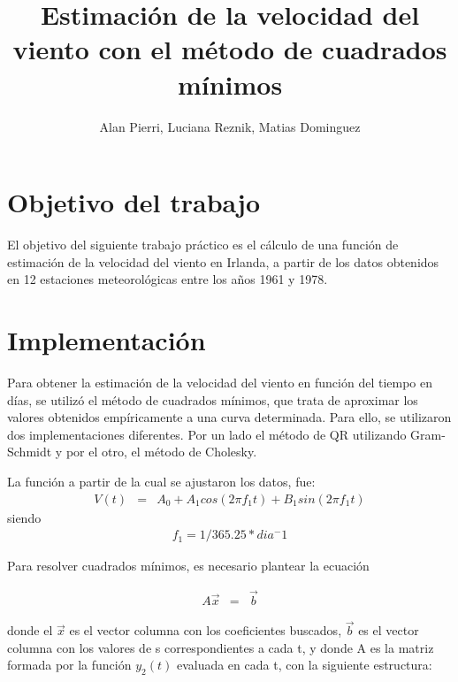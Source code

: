 \documentclass[]{article}
\begin{document}
\title{Estimación de la velocidad del viento con el método de cuadrados mínimos}
\author{Alan Pierri, Luciana Reznik, Matias Dominguez}
\maketitle

\pagebreak

\tableofcontents

\pagebreak


\section{Objetivo del trabajo}
\par El objetivo del siguiente trabajo práctico es el cálculo de una función de estimación de la velocidad del viento en Irlanda, a partir de los datos obtenidos en 12 estaciones meteorológicas entre los años 1961 y 1978.

\pagebreak

\section{Implementación}
\par Para obtener la estimación de la velocidad del viento en función del tiempo en días, se utilizó el método de cuadrados mínimos, que trata de aproximar los valores obtenidos empíricamente a una curva determinada. Para ello, se utilizaron dos implementaciones diferentes. Por un lado  el método de QR utilizando Gram-Schmidt y por el otro, el método de Cholesky.

La función a partir de la cual se ajustaron los datos, fue:
\begin{eqnarray}
	V(t) &=& A_0 + A_1 cos(2 \pi f_1 t) + B_1 sin(2 \pi f_1 t)
\end{eqnarray}
siendo
\begin{eqnarray}
	f_1 = 1/365.25 * dia^-1
\end{eqnarray}

Para resolver cuadrados mínimos, es necesario plantear la ecuación

\begin{eqnarray} \label{eq:solve}
    A\vec{x}&=&\vec{b}
\end{eqnarray}

donde el $\vec{x}$ es el vector columna con los coeficientes buscados, $\vec{b}$ es el vector columna con los valores de s correspondientes a cada  t, y donde A es la matriz formada por la función $y_2(t)$ evaluada en cada t, con la siguiente estructura:
\end{document}
